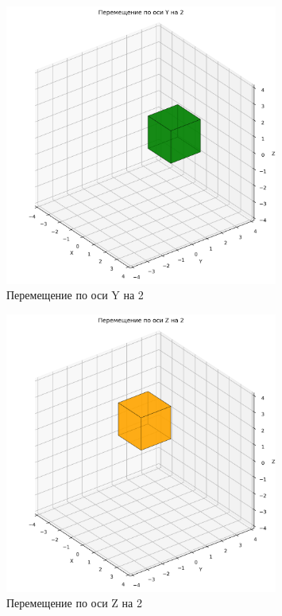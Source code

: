 \begin{figure}[H]
\centering
\includegraphics[width=0.8\textwidth]{images/task3/translate_y.png}
\caption{Перемещение по оси Y на 2}
\end{figure}

\begin{figure}[H]
\centering
\includegraphics[width=0.8\textwidth]{images/task3/translate_z.png}
\caption{Перемещение по оси Z на 2}
\end{figure}

